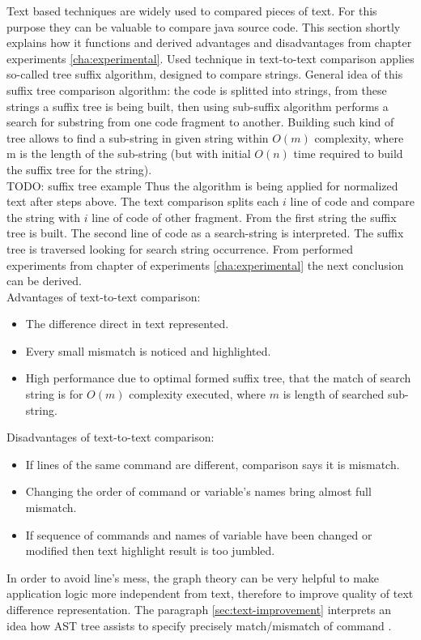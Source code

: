 \documentclass{report}
\begin{document}
Text based techniques are widely used to compared pieces of text. For this purpose they can be valuable to compare java source code. This section shortly explains how it functions and derived advantages and disadvantages from chapter experiments \ref{cha:experimental}. Used technique in text-to-text comparison applies so-called tree suffix algorithm, designed to compare strings. General idea of this suffix tree comparison algorithm: the code is splitted into strings, from these strings a suffix tree is being built, then using sub-suffix algorithm performs a search for substring from one code fragment to another. Building such kind of tree allows to find a sub-string in given string within $O(m)$ complexity, where m is the length of the sub-string (but with initial $O(n)$ time required to build the suffix tree for the string). 
\\
TODO: suffix tree example
Thus the algorithm is being applied for normalized text after steps above. The text comparison splits each $i$ line of code and compare the string with $i$ line of code of other fragment. From the first string the suffix tree is built. The second line of code as a search-string is interpreted. The suffix tree is traversed looking for search string occurrence. From performed experiments from chapter of experiments \ref{cha:experimental} the next conclusion can be derived. \\
Advantages of text-to-text comparison:
\begin{itemize}
	\item The difference direct in text represented.
	\item Every small mismatch is noticed and highlighted.
	\item High performance due to optimal formed suffix tree, that the match of search string is for $O(m)$ complexity executed, where $m$ is length of searched sub-string.
\end{itemize}
Disadvantages of text-to-text comparison:
\begin{itemize}
	\item If lines of the same command are different, comparison says it is mismatch.
	\item Changing the order of command or variable's names bring almost full mismatch.
	\item If sequence of commands and names of variable have been changed or modified then text highlight result is too jumbled.
\end{itemize}

In order to avoid line's mess, the graph theory can be very helpful to make application logic more independent from text, therefore to improve quality of text difference representation. The paragraph \ref{sec:text-improvement} interprets an idea how AST tree assists to specify precisely match/mismatch of command .
\end{document}
